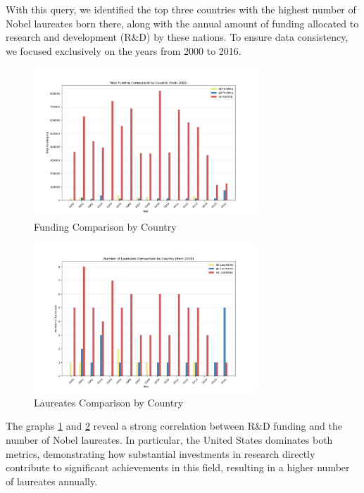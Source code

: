 \documentclass{article}
\begin{document}
\vspace{1em}

With this query, we identified the top three countries with the highest number of Nobel laureates born there,
along with the annual amount of funding allocated to research and development (R\&D) by these nations.
To ensure data consistency, we focused exclusively on the years from 2000 to 2016.

\begin{figure}[H]
	\centering
	\includegraphics[width=0.75\textwidth]{../queries/plots/funding_comparison_by_country.png}
	\caption{Funding Comparison by Country}
	\label{fig:fundings_per_country}
\end{figure}

\begin{figure}[H]
	\centering
	\includegraphics[width=0.75\textwidth]{../queries/plots/laureates_comparison_by_country.png}
	\caption{Laureates Comparison by Country}
	\label{fig:laureates_per_country}
\end{figure}

The graphs \ref{fig:fundings_per_country} and \ref{fig:laureates_per_country} reveal a strong correlation between R\&D
funding and the number of Nobel laureates. In particular, the United States dominates both metrics, demonstrating
how substantial investments in research directly contribute to significant achievements in this field, resulting
in a higher number of laureates annually.
\end{document}
